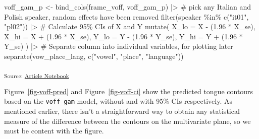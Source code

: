 \documentclass[
]{interact}
\newenvironment{Shaded}{\begin{snugshade}}{\end{snugshade}}
\newcommand{\AttributeTok}[1]{\textcolor[rgb]{0.40,0.45,0.13}{#1}}
\newcommand{\CommentTok}[1]{\textcolor[rgb]{0.37,0.37,0.37}{#1}}
\newcommand{\FloatTok}[1]{\textcolor[rgb]{0.68,0.00,0.00}{#1}}
\newcommand{\FunctionTok}[1]{\textcolor[rgb]{0.28,0.35,0.67}{#1}}
\newcommand{\NormalTok}[1]{\textcolor[rgb]{0.00,0.23,0.31}{#1}}
\newcommand{\OtherTok}[1]{\textcolor[rgb]{0.00,0.23,0.31}{#1}}
\newcommand{\SpecialCharTok}[1]{\textcolor[rgb]{0.37,0.37,0.37}{#1}}
\newcommand{\StringTok}[1]{\textcolor[rgb]{0.13,0.47,0.30}{#1}}
\begin{document}
\begin{Shaded}
\begin{Highlighting}[]
\NormalTok{voff\_gam\_p }\OtherTok{\textless{}{-}} \FunctionTok{bind\_cols}\NormalTok{(frame\_voff, voff\_gam\_p) }\SpecialCharTok{|\textgreater{}} 
  \CommentTok{\# pick any Italian and Polish speaker, random effects have been removed}
  \FunctionTok{filter}\NormalTok{(speaker }\SpecialCharTok{\%in\%} \FunctionTok{c}\NormalTok{(}\StringTok{"it01"}\NormalTok{, }\StringTok{"pl02"}\NormalTok{)) }\SpecialCharTok{|\textgreater{}} 
  \CommentTok{\# Calculate 95\% CIs of X and Y}
  \FunctionTok{mutate}\NormalTok{(}
    \AttributeTok{X\_lo =}\NormalTok{ X }\SpecialCharTok{{-}}\NormalTok{ (}\FloatTok{1.96} \SpecialCharTok{*}\NormalTok{ X\_se),}
    \AttributeTok{X\_hi =}\NormalTok{ X }\SpecialCharTok{+}\NormalTok{ (}\FloatTok{1.96} \SpecialCharTok{*}\NormalTok{ X\_se),}
    \AttributeTok{Y\_lo =}\NormalTok{ Y }\SpecialCharTok{{-}}\NormalTok{ (}\FloatTok{1.96} \SpecialCharTok{*}\NormalTok{ Y\_se),}
    \AttributeTok{Y\_hi =}\NormalTok{ Y }\SpecialCharTok{+}\NormalTok{ (}\FloatTok{1.96} \SpecialCharTok{*}\NormalTok{ Y\_se)}
\NormalTok{  ) }\SpecialCharTok{|\textgreater{}} 
  \CommentTok{\# Separate column into individual variables, for plotting later}
  \FunctionTok{separate}\NormalTok{(vow\_place\_lang, }\FunctionTok{c}\NormalTok{(}\StringTok{"vowel"}\NormalTok{, }\StringTok{"place"}\NormalTok{, }\StringTok{"language"}\NormalTok{))}
\end{Highlighting}
\end{Shaded}

\textsubscript{Source:
\href{https://stefanocoretta.github.io/mv_uti/index.qmd.html}{Article
Notebook}}

Figure~\ref{fig-voff-pred} and Figure~\ref{fig-voff-ci} show the
predicted tongue contours based on the \texttt{voff\_gam} model, without
and with 95\% CIs respectively. As mentioned earlier, there isn't a
straightforward way to obtain any statistical measure of the difference
between the contours on the multivariate plane, so we must be content
with the figure.
\end{document}
